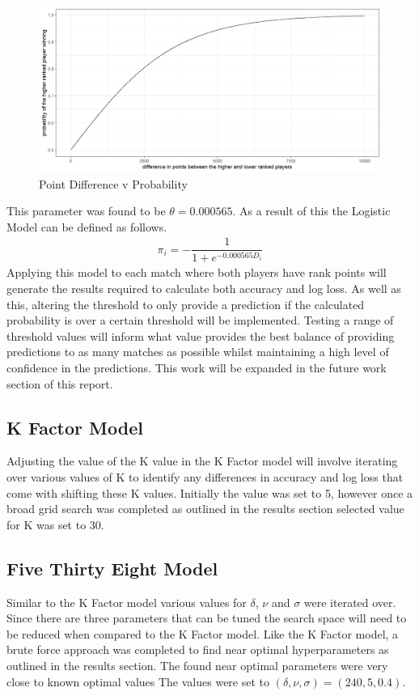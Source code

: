 \documentclass[12pt,a4paper]{article}
\begin{document}
\begin{figure}[H]
  \centering
  \includegraphics[scale=0.6]{images/logistic_curve.png}
  \caption{Point Difference v Probability}
  \label{fig:logisticcurve}
\end{figure}
This parameter was found to be $\theta = 0.000565$. As a
result of this the Logistic Model can be defined as follows.
\begin{gather}
  \pi_i = -\dfrac{1}{1+e^{-0.000565D_i}}
\end{gather}
Applying this model
to each match where both players have rank points will generate the results
required to calculate both accuracy and log loss. As well as this,
altering the threshold to only provide a prediction if the calculated probability
is over a certain threshold will be implemented. Testing a range of threshold
values will inform what value provides the best balance of providing predictions
to as many matches as possible whilst maintaining a high level of confidence in the
predictions. This work will be expanded in the future work section of this report.

\subsection{K Factor Model}
Adjusting the value of the K value in the K Factor model will involve iterating
over various values of K to identify any differences in accuracy and log loss
that come with shifting these K values. Initially the value was set to 5,
however once a broad grid search was completed as outlined in the results section
selected value for K was set to 30.

\subsection{Five Thirty Eight Model}
Similar to the K Factor model various values for $\delta$, $\nu$ and $\sigma$
were iterated over. Since there are three parameters that can be tuned
the search space will need to be reduced when compared to the K Factor model.
Like the K Factor model, a brute force approach was completed to find near optimal
hyperparameters as outlined in the results section. The found near optimal parameters
were very close to known optimal values \cite{kovalchik_searching_2016}
The values were set to $(\delta,\nu,\sigma) = (240,5,0.4)$.
\end{document}
